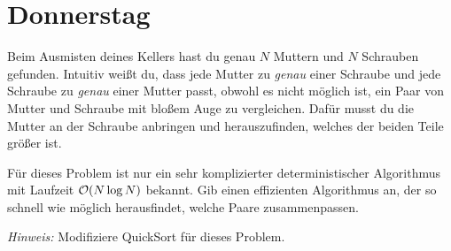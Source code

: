 \documentclass{uebung_cs}
\begin{document}
\section*{Donnerstag}

\begin{aufgabe}
	Beim Ausmisten deines Kellers hast du genau $N$ Muttern und $N$ Schrauben gefunden.
	Intuitiv weißt du, dass jede Mutter zu \emph{genau} einer Schraube und jede Schraube zu \emph{genau} einer Mutter passt, obwohl es nicht möglich ist, ein Paar von Mutter und Schraube mit bloßem Auge zu vergleichen. 
	Dafür musst du die Mutter an der Schraube anbringen und herauszufinden, welches der beiden Teile größer ist. 

	Für dieses Problem ist nur ein sehr komplizierter deterministischer Algorithmus mit Laufzeit $\mathcal{O}(N \log N)$ bekannt. 
	Gib einen effizienten Algorithmus an, der so schnell wie möglich herausfindet, welche Paare zusammenpassen. 
	
	\textit{Hinweis:} Modifiziere QuickSort für dieses Problem.
\end{aufgabe}
\end{document}
